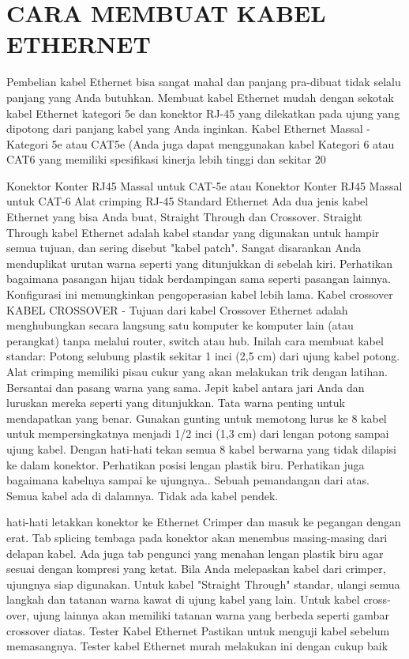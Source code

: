 \section{CARA MEMBUAT KABEL ETHERNET}

Pembelian kabel Ethernet bisa sangat mahal dan panjang pra-dibuat tidak selalu panjang yang Anda butuhkan. Membuat kabel Ethernet mudah dengan sekotak kabel 
Ethernet kategori 5e dan konektor RJ-45 yang dilekatkan pada ujung yang dipotong dari panjang kabel yang Anda inginkan.
Kabel Ethernet Massal - Kategori 5e atau CAT5e
(Anda juga dapat menggunakan kabel Kategori 6 atau CAT6 yang memiliki spesifikasi kinerja lebih tinggi dan sekitar 20%

Konektor Konter RJ45 Massal untuk CAT-5e atau Konektor Konter RJ45 Massal untuk CAT-6
Alat crimping RJ-45
Standard Ethernet Ada dua jenis kabel Ethernet yang bisa Anda buat, Straight Through dan Crossover.
Straight Through kabel Ethernet adalah kabel standar yang digunakan untuk hampir semua tujuan, dan sering disebut "kabel patch". Sangat disarankan Anda 
menduplikat urutan warna seperti yang ditunjukkan di sebelah kiri. Perhatikan bagaimana pasangan hijau tidak berdampingan sama seperti pasangan lainnya. 
Konfigurasi ini memungkinkan pengoperasian kabel lebih lama.
Kabel crossover
KABEL CROSSOVER - Tujuan dari kabel Crossover Ethernet adalah menghubungkan secara langsung satu komputer ke komputer lain (atau perangkat) tanpa melalui 
router, switch atau hub.
Inilah cara membuat kabel standar:
Potong selubung plastik sekitar 1 inci (2,5 cm) dari ujung kabel potong. Alat crimping memiliki pisau cukur yang akan melakukan trik dengan latihan.
Bersantai dan pasang warna yang sama.
Jepit kabel antara jari Anda dan luruskan mereka seperti yang ditunjukkan. Tata warna penting untuk mendapatkan yang benar.
Gunakan gunting untuk memotong lurus ke 8 kabel untuk mempersingkatnya menjadi 1/2 inci (1,3 cm) dari lengan potong sampai ujung kabel.
Dengan hati-hati tekan semua 8 kabel berwarna yang tidak dilapisi ke dalam konektor. Perhatikan posisi lengan plastik biru. Perhatikan juga bagaimana kabelnya
 sampai ke ujungnya..
Sebuah pemandangan dari atas. Semua kabel ada di dalamnya. Tidak ada kabel pendek.
 

hati-hati letakkan konektor ke Ethernet Crimper dan masuk ke pegangan dengan erat. Tab splicing tembaga pada konektor akan menembus masing-masing dari delapan 
kabel. Ada juga tab pengunci yang menahan lengan plastik biru agar sesuai dengan kompresi yang ketat. Bila Anda melepaskan kabel dari crimper, ujungnya siap 
digunakan.
Untuk kabel "Straight Through" standar, ulangi semua langkah dan tatanan warna kawat di ujung kabel yang lain. Untuk kabel cross-over, ujung lainnya akan 
memiliki tatanan warna yang berbeda seperti gambar crossover diatas.
Tester Kabel Ethernet
Pastikan untuk menguji kabel sebelum memasangnya. Tester kabel Ethernet murah melakukan ini dengan cukup baik

\cite{caniggia2003common}
\cite{jakovljevic2008common}
\cite{ueda2011transmission}
\cite{gagnon2002cable}
\cite{ueda2011transmission}
\cite{gomez2003receive}
\cite{blouin2002cross}